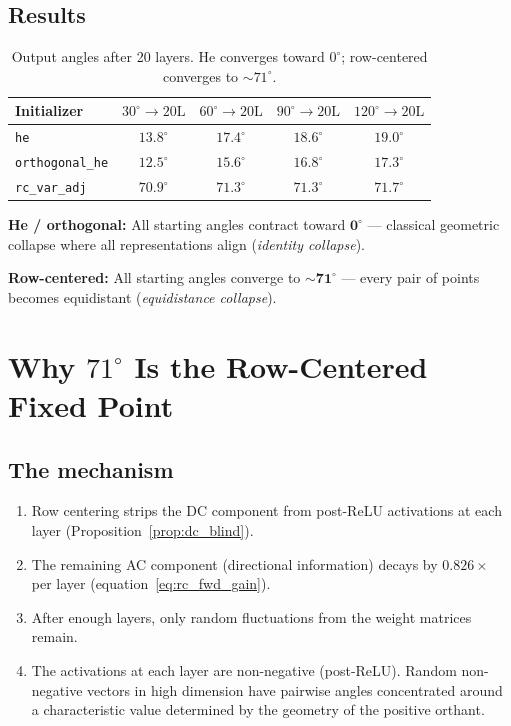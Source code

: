 \subsection{Results}

\begin{table}[h]
\centering
\begin{tabular}{lcccc}
\toprule
Initializer & $30^\circ \to 20\text{L}$ &
$60^\circ \to 20\text{L}$ &
$90^\circ \to 20\text{L}$ &
$120^\circ \to 20\text{L}$ \\
\midrule
\texttt{he}           & $13.8^\circ$ & $17.4^\circ$ & $18.6^\circ$ & $19.0^\circ$ \\
\texttt{orthogonal\_he} & $12.5^\circ$ & $15.6^\circ$ & $16.8^\circ$ & $17.3^\circ$ \\
\texttt{rc\_var\_adj} & $\bm{70.9^\circ}$ & $\bm{71.3^\circ}$ & $\bm{71.3^\circ}$ & $\bm{71.7^\circ}$ \\
\bottomrule
\end{tabular}
\caption{Output angles after 20 layers.  He converges toward $0^\circ$;
row-centered converges to ${\sim}71^\circ$.}
\label{tab:angle_evolution}
\end{table}

\textbf{He / orthogonal:}
All starting angles contract toward $\bm{0^\circ}$ --- classical
geometric collapse where all representations align
(\emph{identity collapse}).

\textbf{Row-centered:}
All starting angles converge to $\bm{\sim\!71^\circ}$ --- every pair
of points becomes equidistant (\emph{equidistance collapse}).

\section{Why $71^\circ$ Is the Row-Centered Fixed Point}
\label{sec:why_71}

\subsection{The mechanism}

\begin{enumerate}
  \item Row centering strips the DC component from post-ReLU
        activations at each layer
        (Proposition~\ref{prop:dc_blind}).
  \item The remaining AC component (directional information) decays
        by $0.826\times$ per layer (equation~\eqref{eq:rc_fwd_gain}).
  \item After enough layers, only random fluctuations from the weight
        matrices remain.
  \item The activations at each layer are non-negative (post-ReLU).
        Random non-negative vectors in high dimension have pairwise
        angles concentrated around a characteristic value determined by
        the geometry of the positive orthant.
\end{enumerate}

